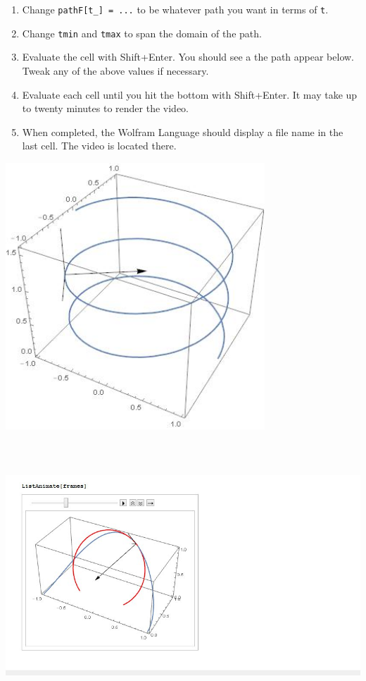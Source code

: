 \begin{enumerate}
\item Change \verb+pathF[t_] = ...+ to be whatever path you want in terms of \verb+t+.
\item Change \verb+tmin+ and \verb+tmax+ to span the domain of the path.
\item Evaluate the cell with Shift+Enter. You should see a the path appear below. Tweak any of the above values if necessary.
\item Evaluate each cell until you hit the bottom with Shift+Enter. It may take up to twenty minutes to render the video.
\item When completed, the Wolfram Language should display a file name in the last cell. The video is located there.
\end{enumerate}

\includegraphics[height=10cm]{../exhibit/frenet1.jpg}

\includegraphics[height=10cm]{../exhibit/frenet2.jpg}

